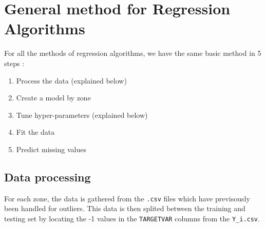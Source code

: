 \section{General method for Regression Algorithms}       
For all the methods of regression algorithms, we have the same basic method in 5 steps : 
\begin{enumerate}
    \item Process the data  (explained below)
    \item Create a model by zone
    \item Tune hyper-parameters  (explained below)
    \item Fit the data
    \item Predict missing values
\end{enumerate}
\subsection*{Data processing}
For each zone, the data is gathered from the \verb|.csv| files which have previsously been handled for outliers. This data is then splited between the training and testing set by locating the -1 values in the \verb|TARGETVAR| columns from the \verb|Y_i.csv|.

